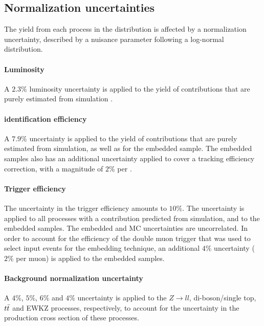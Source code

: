 \subsection{Normalization uncertainties}

The yield from each process in the \mttot distribution is affected by a normalization uncertainty, described by a nuisance parameter following a log-normal distribution.

\paragraph{Luminosity} A $2.3 \%$ luminosity uncertainty is applied to the yield of contributions that are purely estimated from simulation \cite{CMS:2018elu}.

\paragraph{\tauh identification efficiency} A $7.9\%$ uncertainty is applied to the yield of contributions that are purely estimated from simulation, as well as for the embedded sample. The embedded samples also has an additional uncertainty applied to cover a tracking efficiency correction, with a magnitude of $2\%$ per \tauh.

\paragraph{Trigger efficiency} The uncertainty in the trigger efficiency amounts to $10\%$. The uncertainty is applied to all processes with a contribution predicted from simulation, and to the embedded samples. The embedded and MC uncertainties are uncorrelated. In order to account for the efficiency of the double muon trigger that was used to select input events for the embedding technique, an additional $4\%$ uncertainty ($2\%$ per muon) is applied to the embedded samples.

\paragraph{Background normalization uncertainty} A $4\%$, $5\%$, $6\%$ and $4\%$ uncertainty is applied to the $Z\rightarrow ll$, di-boson/single top, $t\Bar{t}$ and EWKZ processes, respectively, to account for the uncertainty in the production cross section of these processes. 


